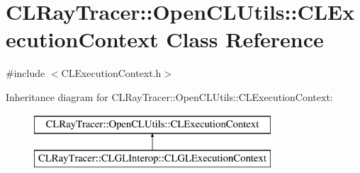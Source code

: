 \hypertarget{class_c_l_ray_tracer_1_1_open_c_l_utils_1_1_c_l_execution_context}{}\section{C\+L\+Ray\+Tracer\+:\+:Open\+C\+L\+Utils\+:\+:C\+L\+Execution\+Context Class Reference}
\label{class_c_l_ray_tracer_1_1_open_c_l_utils_1_1_c_l_execution_context}


{\ttfamily \#include $<$C\+L\+Execution\+Context.\+h$>$}

Inheritance diagram for C\+L\+Ray\+Tracer\+:\+:Open\+C\+L\+Utils\+:\+:C\+L\+Execution\+Context\+:\begin{figure}[H]
\begin{center}
\leavevmode
\includegraphics[height=2.000000cm]{class_c_l_ray_tracer_1_1_open_c_l_utils_1_1_c_l_execution_context}
\end{center}
\end{figure}
